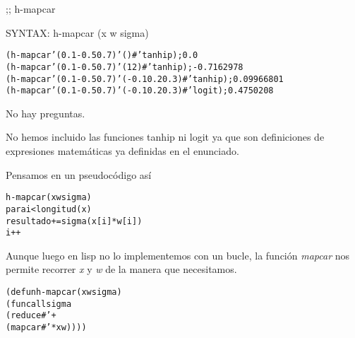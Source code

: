 \begin{aibox}{\function}
;; h-mapcar

SYNTAX: h-mapcar (x w sigma) 
\end{aibox}

\begin{aibox}{\examples}
\begin{alltt}
(h-mapcar '(0.1 -0.5 0.7) '() #'tanhip); 0.0
(h-mapcar '(0.1 -0.5 0.7) '(1 2) #'tanhip); -0.7162978
(h-mapcar '(0.1 -0.5 0.7) '(-0.1 0.2 0.3) #'tanhip); 0.09966801
(h-mapcar '(0.1 -0.5 0.7) '(-0.1 0.2 0.3) #'logit); 0.4750208
\end{alltt}
\end{aibox}

\begin{aibox}{\comments}
\end{aibox}
\begin{aibox}{\answers}
No hay preguntas.
\end{aibox}

\begin{aibox}{\othercomments}
No hemos incluido las funciones tanhip ni logit ya que son definiciones de expresiones matemáticas ya definidas en el enunciado.
\end{aibox}
\begin{aibox}{\pseudocode}
Pensamos en un pseudocódigo así
\begin{alltt}
h-mapcar (x w sigma)
    para i < longitud(x)
        resultado += sigma(x[i]*w[i])
        i++
\end{alltt}

Aunque luego en lisp no lo implementemos con un bucle, la función \emph{mapcar} nos permite recorrer \emph{x} y \emph{w} de la manera que necesitamos.
\end{aibox}
\begin{aibox}{\code}

\begin{alltt}
(defun h-mapcar (x w sigma) 
    (funcall sigma 
        (reduce #'+
            (mapcar #'* x w))))
\end{alltt}
\end{aibox}
